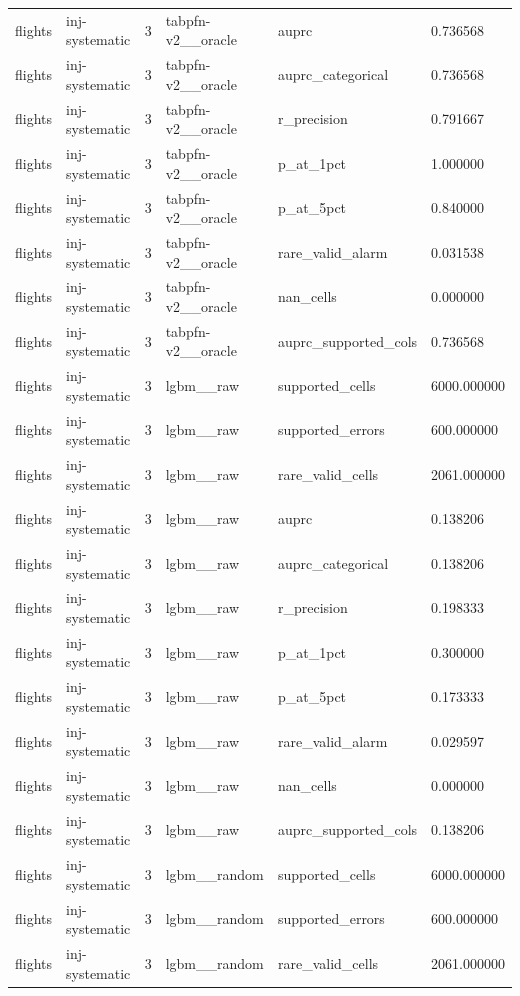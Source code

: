 \begin{tabular}{llllll}
flights & inj-systematic & 3 & tabpfn-v2\_\_oracle & auprc & 0.736568 \\
flights & inj-systematic & 3 & tabpfn-v2\_\_oracle & auprc\_categorical & 0.736568 \\
flights & inj-systematic & 3 & tabpfn-v2\_\_oracle & r\_precision & 0.791667 \\
flights & inj-systematic & 3 & tabpfn-v2\_\_oracle & p\_at\_1pct & 1.000000 \\
flights & inj-systematic & 3 & tabpfn-v2\_\_oracle & p\_at\_5pct & 0.840000 \\
flights & inj-systematic & 3 & tabpfn-v2\_\_oracle & rare\_valid\_alarm & 0.031538 \\
flights & inj-systematic & 3 & tabpfn-v2\_\_oracle & nan\_cells & 0.000000 \\
flights & inj-systematic & 3 & tabpfn-v2\_\_oracle & auprc\_supported\_cols & 0.736568 \\
flights & inj-systematic & 3 & lgbm\_\_raw & supported\_cells & 6000.000000 \\
flights & inj-systematic & 3 & lgbm\_\_raw & supported\_errors & 600.000000 \\
flights & inj-systematic & 3 & lgbm\_\_raw & rare\_valid\_cells & 2061.000000 \\
flights & inj-systematic & 3 & lgbm\_\_raw & auprc & 0.138206 \\
flights & inj-systematic & 3 & lgbm\_\_raw & auprc\_categorical & 0.138206 \\
flights & inj-systematic & 3 & lgbm\_\_raw & r\_precision & 0.198333 \\
flights & inj-systematic & 3 & lgbm\_\_raw & p\_at\_1pct & 0.300000 \\
flights & inj-systematic & 3 & lgbm\_\_raw & p\_at\_5pct & 0.173333 \\
flights & inj-systematic & 3 & lgbm\_\_raw & rare\_valid\_alarm & 0.029597 \\
flights & inj-systematic & 3 & lgbm\_\_raw & nan\_cells & 0.000000 \\
flights & inj-systematic & 3 & lgbm\_\_raw & auprc\_supported\_cols & 0.138206 \\
flights & inj-systematic & 3 & lgbm\_\_random & supported\_cells & 6000.000000 \\
flights & inj-systematic & 3 & lgbm\_\_random & supported\_errors & 600.000000 \\
flights & inj-systematic & 3 & lgbm\_\_random & rare\_valid\_cells & 2061.000000 \\

\end{tabular}
